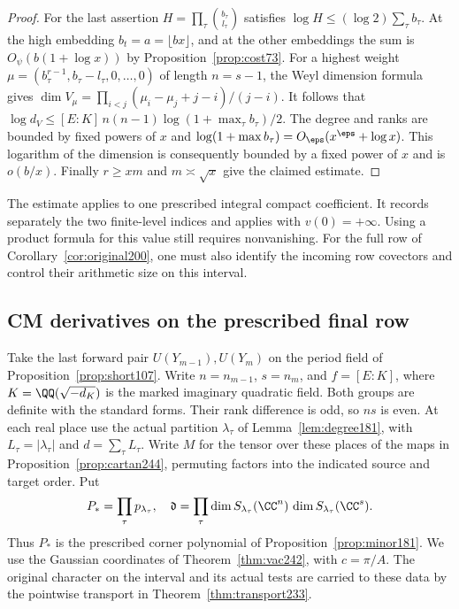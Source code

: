 \documentclass[a4paper,11pt]{article}
\theoremstyle{definition}
\theoremstyle{remark}
\numberwithin{equation}{section}
\begin{document}
\begin{proof}
For the last assertion \(H=\prod_\tau\binom{b_\tau}{l_\tau}\)
satisfies \(\log H\le(\log2)\sum_\tau b_\tau\). At the high
embedding \(b_t=a=\lfloor bx\rfloor\), and at the other
embeddings the sum is \(O_\psi(b(1+\log x))\) by
Proposition~\ref{prop:cost73}. For a highest weight
\(\mu=(b_\tau^{r-1},b_\tau-l_\tau,0,\ldots,0)\) of length
\(n=s-1\), the Weyl dimension formula gives
\(\dim V_\mu=\prod_{i<j}(\mu_i-\mu_j+j-i)/(j-i)\).
It follows that
\(\log d_V\le [E:K]\,n(n-1)\log(1+\max_\tau b_\tau)/2\).
The degree and ranks are bounded by fixed powers of \(x\) and
\(\log(1+\max b_\tau)=O_\eps(x^\eps+\log x)\). This logarithm
of the dimension is consequently bounded by a fixed power of
\(x\) and is \(o(b/x)\). Finally \(r\ge xm\) and
\(m\asymp\sqrt x\) give the claimed estimate.
\end{proof}

The estimate applies to one prescribed integral compact coefficient.
It records separately the two finite-level indices and applies with
\(v(0)=+\infty\). Using a product formula for this value still
requires nonvanishing. For the full row of
Corollary~\ref{cor:original200}, one must also identify the
incoming row covectors and control their arithmetic size on this
interval.

\subsection{CM derivatives on the prescribed final row}\label{nav:VIII-35}
Take the last forward pair \(U(Y_{m-1}),U(Y_m)\) on the period
field of Proposition~\ref{prop:short107}. Write \(n=n_{m-1}\),
\(s=n_m\), and \(f=[E:K]\), where \(K=\QQ(\sqrt{-d_K})\) is
the marked imaginary quadratic field. Both groups are definite
with the standard forms. Their rank difference is odd, so \(ns\)
is even. At each real place use the actual partition
\(\lambda_\tau\) of Lemma~\ref{lem:degree181}, with
\(L_\tau=|\lambda_\tau|\) and \(d=\sum_\tau L_\tau\).
Write \(M\) for the tensor over these places of the maps in
Proposition~\ref{prop:cartan244}, permuting factors into the
indicated source and target order. Put
\[
 P_*=\prod_\tau p_{\lambda_\tau},\quad
 \mathfrak d=\prod_\tau\dim S_{\lambda_\tau}(\CC^n)\,
                             \dim S_{\lambda_\tau}(\CC^s).
\]
Thus \(P_*\) is the prescribed corner polynomial of
Proposition~\ref{prop:minor181}. We use the Gaussian coordinates
of Theorem~\ref{thm:vac242}, with \(c=\pi/A\). The original
character on the interval and its actual tests are carried to these data
by the pointwise transport in Theorem~\ref{thm:transport233}.
\end{document}

